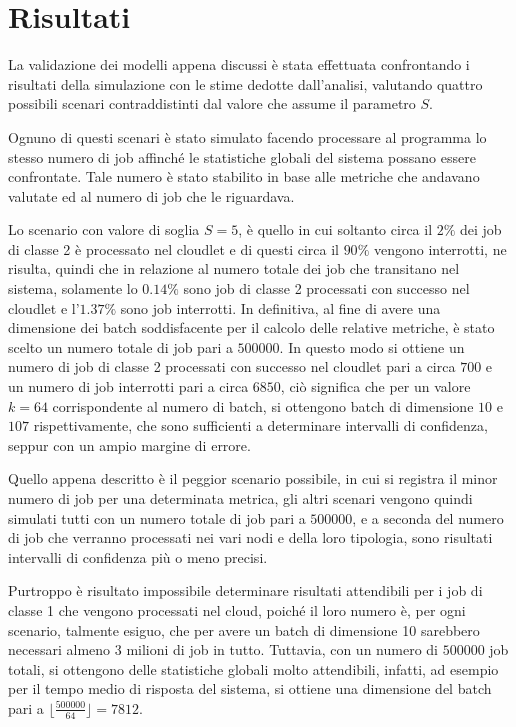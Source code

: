 \section{Risultati}
\newcommand{\epsmx}{$\varepsilon_{max}$}
La validazione dei modelli appena discussi è stata effettuata confrontando i
risultati della simulazione con le stime dedotte dall'analisi, valutando quattro
possibili scenari contraddistinti dal valore che assume il parametro $S$.

Ognuno di questi scenari è stato simulato facendo processare al programma lo
stesso numero di job affinché le statistiche globali del sistema possano
essere confrontate. Tale numero è stato stabilito in base alle metriche che
andavano valutate ed al numero di job che le riguardava.

Lo scenario con valore di soglia $S=5$, è quello in cui soltanto circa il $2\%$
dei job di classe 2 è processato nel cloudlet e di questi circa il $90\%$
vengono interrotti, ne risulta, quindi che in relazione al numero totale dei job
che transitano nel sistema, solamente lo $0.14\%$ sono job di classe 2
processati con successo nel cloudlet e l'$1.37\%$ sono job interrotti. In
definitiva, al fine di avere una dimensione dei batch soddisfacente per il
calcolo delle relative metriche, è stato scelto un numero totale di job pari a
$500000$. In questo modo si ottiene un numero di job di classe 2 processati con
successo nel cloudlet pari a circa $700$ e un numero di job interrotti pari a
circa $6850$, ciò significa che per un valore $k=64$ corrispondente al numero
di batch, si ottengono batch di dimensione $10$ e $107$ rispettivamente, che
sono sufficienti a determinare intervalli di confidenza, seppur con un ampio
margine di errore.

Quello appena descritto è il peggior scenario possibile, in cui si registra il
minor numero di job per una determinata metrica, gli altri scenari vengono
quindi simulati tutti con un numero totale di job pari a $500000$, e a seconda
del numero di job che verranno processati nei vari nodi e della loro tipologia,
sono risultati intervalli di confidenza più o meno precisi.

Purtroppo è risultato impossibile determinare risultati attendibili per i job
di classe 1 che vengono processati nel cloud, poiché il loro numero è, per ogni
scenario, talmente esiguo, che per avere un batch di dimensione 10 sarebbero
necessari almeno 3 milioni di job in tutto. Tuttavia, con un numero di
$500000$ job totali, si ottengono delle statistiche globali molto attendibili,
infatti, ad esempio per il tempo medio di risposta del sistema, si ottiene 
una dimensione del batch pari a $\lfloor\frac{500000}{64}\rfloor = 7812$.

